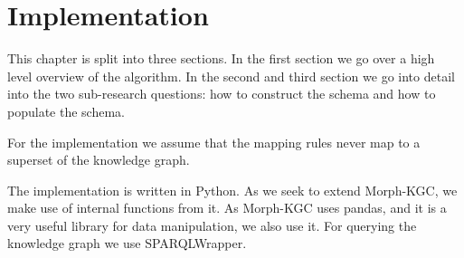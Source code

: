 \chapter{Implementation}
\label{chapter:implementation}
This chapter is split into three sections. In the first section we go over a high level overview of the algorithm. In the second and third section we go into detail into the two sub-research questions: how to construct the schema and how to populate the schema. 


For the implementation we assume that the mapping rules never map to a superset of the knowledge graph. 

The implementation is written in Python. As we seek to extend Morph-KGC, we make use of internal functions from it. As Morph-KGC uses pandas, and it is a very useful library for data manipulation, we also use it. For querying the knowledge graph we use SPARQLWrapper.